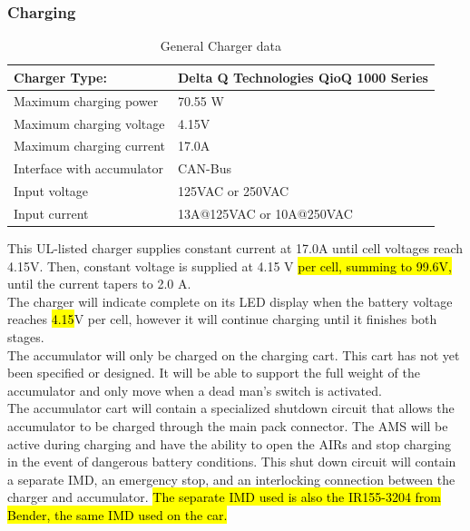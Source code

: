 \documentclass{article}
\DeclareRobustCommand{\hlr}[1]{{\sethlcolor{red}\hl{#1}}}
\begin{document}
        \subsubsection{Charging} \label{charging}
            
            
            \begin{table}[H]
            \centering
            \begin{tabular}{|l|l|}
            \hline
            Charger Type: & Delta Q Technologies QioQ 1000 Series \\ \hline
            Maximum charging power & 70.55 W \\ \hline
            Maximum charging voltage & 4.15V \\ \hline
            Maximum charging current & 17.0A \\ \hline
            Interface with accumulator & CAN-Bus \\ \hline
            Input voltage & 125VAC or 250VAC \\ \hline
            Input current & 13A@125VAC or 10A@250VAC \\ \hline
            \end{tabular}
            \caption{General Charger data}
            \label{charger}
            \end{table}
            
            This UL-listed charger supplies constant current at 17.0A until cell voltages reach 4.15V. Then, constant voltage is supplied at 4.15 V \hlr{per cell, summing to 99.6V,} until the current tapers to 2.0 A.\\
            
            The charger will indicate complete on its LED display when the battery voltage reaches \hlr{4.15}V per cell, however it will continue charging until it finishes both stages.\\
            
            The accumulator will only be charged on the charging cart. This cart has not yet been specified or designed. It will be able to support the full weight of the accumulator and only move when a dead man's switch is activated.\\
            
            The accumulator cart will contain a specialized shutdown circuit that allows the accumulator to be charged through the main pack connector. The AMS will be active during charging and have the ability to open the AIRs and stop charging in the event of dangerous battery conditions. This shut down circuit will contain a separate IMD, an emergency stop, and an interlocking connection between the charger and accumulator. \hlr{ The separate IMD used is also the IR155-3204 from Bender, the same IMD used on the car.} 
\end{document}
